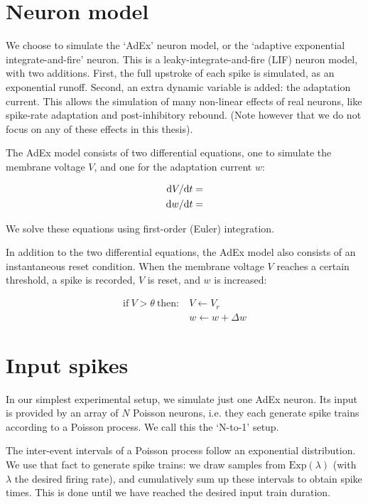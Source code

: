
\section{Neuron model}

We choose to simulate the `AdEx' neuron model, or the `adaptive exponential integrate-and-fire' neuron.
This is a leaky-integrate-and-fire (LIF) neuron model, with two additions.
First, the full upstroke of each spike is simulated, as an exponential runoff.
Second, an extra dynamic variable is added: the adaptation current.
This allows the simulation of many non-linear effects of real neurons, like spike-rate adaptation and post-inhibitory rebound. (Note however that we do not focus on any of these effects in this thesis).

The AdEx model consists of two differential equations, one to simulate the membrane voltage $V$, and one for the adaptation current $w$:

\begin{align*}
    \mathrm{d}V / \mathrm{d}t &=  \\
    \mathrm{d}w / \mathrm{d}t &=
\end{align*}

We solve these equations using first-order (Euler) integration.

In addition to the two differential equations, the AdEx model also consists of an instantaneous reset condition. When the membrane voltage $V$ reaches a certain threshold, a spike is recorded, $V$ is reset, and $w$ is increased:

\begin{align*}
    \text{if}\ V > \theta\ \text{then:}\
    & V \leftarrow V_r \\
    & w \leftarrow w + \Delta w
\end{align*}


\section{Input spikes}

In our simplest experimental setup, we simulate just one AdEx neuron.
Its input is provided by an array of $N$ Poisson neurons, i.e. they each generate spike trains according to a Poisson process. We call this the `N-to-1' setup.

The inter-event intervals of a Poisson process follow an exponential distribution.
We use that fact to generate spike trains: we draw samples from $\mathrm{Exp}(\lambda)$ (with $\lambda$ the desired firing rate), and cumulatively sum up these intervals  to obtain spike times. This is done until we have reached the desired input train duration.



